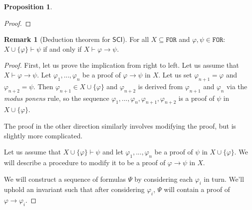 \documentclass{article}
\theoremstyle{definition}
\theoremstyle{definition}
\theoremstyle{definition}
\newtheorem{remark}{Remark}[section]
\theoremstyle{definition}
\theoremstyle{definition}
\newtheorem{proposition}{Proposition}[section]
\newcommand*{\ra}{\rightarrow}
\newcommand*{\FOR}{\texttt{FOR}}
\newcommand{\SCI}{$\mathsf{SCI}$\xspace}
\newcommand{\PC}{$\mathsf{PC}$\xspace}
\begin{document}
\begin{proposition}
\begin{proof}
    \end{proof}
\end{proposition}

\begin{remark}[Deduction theorem for \SCI]
    For all $X \subseteq \FOR$ and $\varphi, \psi \in \FOR$: $X \cup \{\varphi\} \vdash \psi$ if and only if $X \vdash \varphi \ra \psi$.
    \begin{proof}
        First, let us prove the implication from right to left. Let us assume that $X \vdash \varphi \ra \psi$. Let $\varphi_1, ..., \varphi_n$ be a proof of $\varphi \ra \psi$ in $X$. Let us set $\varphi_{n+1} = \varphi$ and $\varphi_{n+2} = \psi$. Then $\varphi_{n+1} \in X \cup \{\varphi\}$ and $\varphi_{n+2}$ is derived from $\varphi_{n+1}$ and $\varphi_{n}$ via the \emph{modus ponens} rule, so the sequence $\varphi_1, ..., \varphi_n, \varphi_{n+1}, \varphi_{n+2}$ is a proof of $\psi$ in $X \cup \{\varphi\}$.

        The proof in the other direction similarly involves modifying the proof, but is
        slightly more complicated.

        Let us assume that $X \cup \{\varphi\} \vdash \psi$ and let $\varphi_1, ...,
            \varphi_n$ be a proof of $\psi$ in $X \cup \{\varphi\}$. We will describe a
        procedure to modify it to be a proof of $\varphi \ra \psi$ in $X$.

        We will construct a sequence of formulas $\Psi$ by considering each $\varphi_i$
        in turn. We'll uphold an invariant such that after considering $\varphi_i$,
        $\Psi$ will contain a proof of $\varphi \ra \varphi_i$.


\end{proof}
\end{remark}
\end{document}
